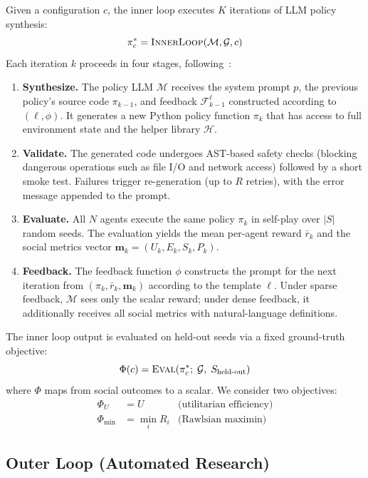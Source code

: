 \documentclass[sigconf,authordraft]{acmart}
\newcommand{\cM}{\mathcal{M}}
\newcommand{\cG}{\mathcal{G}}
\newcommand{\bm}{\mathbf{m}}
\begin{document}
Given a configuration $c$, the inner loop executes $K$ iterations of LLM policy synthesis:
\begin{equation}
  \pi^*_c = \textsc{InnerLoop}(\cM, \cG, c)
\end{equation}
Each iteration $k$ proceeds in four stages, following~\cite{gallego2026}:
\begin{enumerate}
  \item \textbf{Synthesize.} The policy LLM $\cM$ receives the system prompt $p$, the previous policy's source code $\pi_{k-1}$, and feedback $\mathcal{F}_{k-1}^\ell$ constructed according to $(\ell, \phi)$. It generates a new Python policy function $\pi_k$ that has access to full environment state and the helper library $\mathcal{H}$.
  \item \textbf{Validate.} The generated code undergoes AST-based safety checks (blocking dangerous operations such as file I/O and network access) followed by a short smoke test. Failures trigger re-generation (up to $R$ retries), with the error message appended to the prompt.
  \item \textbf{Evaluate.} All $N$ agents execute the same policy $\pi_k$ in self-play over $|S|$ random seeds. The evaluation yields the mean per-agent reward $\bar{r}_k$ and the social metrics vector $\bm_k = (U_k, E_k, S_k, P_k)$.
  \item \textbf{Feedback.} The feedback function $\phi$ constructs the prompt for the next iteration from $(\pi_k, \bar{r}_k, \bm_k)$ according to the template $\ell$. Under sparse feedback, $\cM$ sees only the scalar reward; under dense feedback, it additionally receives all social metrics with natural-language definitions.
\end{enumerate}

The inner loop output is evaluated on held-out seeds via a fixed ground-truth objective:
\begin{equation}
  \Phi(c) = \textsc{Eval}(\pi^*_c;\; \cG,\; S_{\text{held-out}})
  \label{eq:phi}
\end{equation}
where $\Phi$ maps from social outcomes to a scalar. We consider two objectives:
\begin{align}
  \Phi_U &= U & \text{(utilitarian efficiency)} \label{eq:eff}\\
  \Phi_{\min} &= \min_i R_i & \text{(Rawlsian maximin)} \label{eq:rawls}
\end{align}

\subsection{Outer Loop (Automated Research)}
\end{document}
